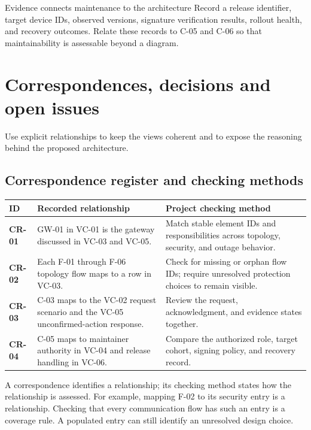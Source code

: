 \documentclass[11pt,letterpaper]{article}
\newcommand{\id}[1]{\textsf{\textbf{#1}}}
\newcommand{\tablehead}[1]{\sffamily\bfseries\color{Navy}#1}
\newcommand{\pageintro}[1]{{\color{Muted}#1}\par\vspace{3pt}}
\begin{document}
\begin{notebox}{Evidence connects maintenance to the architecture}
\small
Record a release identifier, target device IDs, observed versions, signature
verification results, rollout health, and recovery outcomes. Relate these
records to C-05 and C-06 so that maintainability is assessable beyond a diagram.
\end{notebox}

\newpage
\section{Correspondences, decisions and open issues}
\pageintro{Use explicit relationships to keep the views coherent and to expose the
reasoning behind the proposed architecture.}

\subsection{Correspondence register and checking methods}
{\small
\begin{tabularx}{\linewidth}{@{}L{0.46in}Y Y@{}}
\toprule
\tablehead{ID} & \tablehead{Recorded relationship} & \tablehead{Project checking method}\\
\midrule
\id{CR-01} & GW-01 in VC-01 is the gateway discussed in VC-03 and VC-05. & Match stable
element IDs and responsibilities across topology, security, and outage behavior.\\
\id{CR-02} & Each F-01 through F-06 topology flow maps to a row in VC-03. & Check for
missing or orphan flow IDs; require unresolved protection choices to remain visible.\\
\id{CR-03} & C-03 maps to the VC-02 request scenario and the VC-05 unconfirmed-action
response. & Review the request, acknowledgment, and evidence states together.\\
\id{CR-04} & C-05 maps to maintainer authority in VC-04 and release handling in VC-06.
& Compare the authorized role, target cohort, signing policy, and recovery record.\\
\bottomrule
\end{tabularx}}

A correspondence identifies a relationship; its checking method states how the
relationship is assessed. For example, mapping F-02 to its security entry is a
relationship. Checking that every communication flow has such an entry is a
coverage rule. A populated entry can still identify an unresolved design choice.
\end{document}
